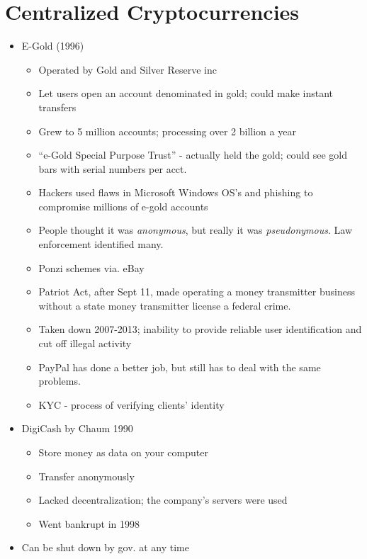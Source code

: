 \documentclass{article}
\begin{document}
\section*{Centralized Cryptocurrencies}
\begin{itemize}
  \item E-Gold (1996)
    \begin{itemize}
      \item Operated by Gold and Silver Reserve inc 
      \item Let users open an account denominated in gold; could make instant transfers
      \item Grew to 5 million accounts; processing over 2 billion a year
      \item ``e-Gold Special Purpose Trust'' - actually held the gold; could see gold bars with serial numbers per acct.
      \item Hackers used flaws in Microsoft Windows OS's and phishing to compromise millions of e-gold accounts
      \item People thought it was \emph{anonymous}, but really it was \emph{pseudonymous}. Law enforcement identified many.
      \item Ponzi schemes via. eBay 
      \item Patriot Act, after Sept 11, made operating a money transmitter business without a state money transmitter license a federal crime.
      \item Taken down 2007-2013; inability to provide reliable user identification and cut off illegal activity
      \item PayPal has done a better job, but still has to deal with the same problems.
      \item KYC - process of verifying clients' identity
    \end{itemize}
  \item DigiCash by Chaum 1990
    \begin{itemize}
      \item Store money as data on your computer
      \item Transfer anonymously
      \item Lacked decentralization; the company's servers were used
      \item Went bankrupt in 1998
    \end{itemize}
  \item Can be shut down by gov. at any time
\end{itemize}
\end{document}
